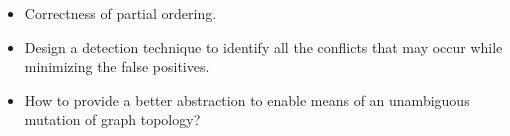 \begin{frame}
\begin{itemize}
  \item Correctness of partial ordering.
  \linebreak
  \item Design a detection technique to identify all the conflicts that may occur while minimizing the false positives.
  \linebreak
  \item How to provide a better abstraction to enable means of an unambiguous mutation of graph topology?
\end{itemize}
\end{frame}


